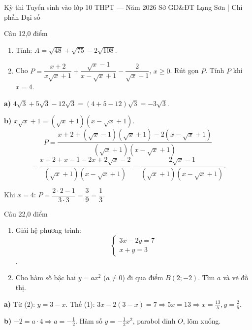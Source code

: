 ﻿%
%
  {Kỳ thi Tuyển sinh vào lớp 10 THPT — Năm 2026}%
  {Sở GD\&ĐT Lạng Sơn | Chỉ phần Đại số}

\begin{de_cau}{Câu 1}{2,0 điểm}
\begin{enumerate}[label=\alph*)]
\item Tính: $A = \sqrt{48} + \sqrt{75} - 2\sqrt{108}$.
\item Cho $P = \dfrac{x+2}{x\sqrt{x}+1} + \dfrac{\sqrt{x}-1}{x-\sqrt{x}+1} - \dfrac{2}{\sqrt{x}+1}$, $x\geq 0$.
Rút gọn $P$. Tính $P$ khi $x = 4$.
\end{enumerate}
\end{de_cau}

\begin{loi_giai_cau}
\textbf{a)} $4\sqrt{3}+5\sqrt{3}-12\sqrt{3}=(4+5-12)\sqrt{3}=-3\sqrt{3}$.

\textbf{b)} $x\sqrt{x}+1=(\sqrt{x}+1)(x-\sqrt{x}+1)$.
\[P=\frac{x+2+(\sqrt{x}-1)(\sqrt{x}+1)-2(x-\sqrt{x}+1)}{(\sqrt{x}+1)(x-\sqrt{x}+1)}\]
\[=\frac{x+2+x-1-2x+2\sqrt{x}-2}{(\sqrt{x}+1)(x-\sqrt{x}+1)}=\frac{2\sqrt{x}-1}{(\sqrt{x}+1)(x-\sqrt{x}+1)}.\]

Khi $x=4$: $P=\dfrac{2\cdot 2-1}{3\cdot 3}=\dfrac{3}{9}=\dfrac{1}{3}$.
\end{loi_giai_cau}

\begin{de_cau}{Câu 2}{2,0 điểm}
\begin{enumerate}[label=\alph*)]
\item Giải hệ phương trình: 
\[ \begin{cases}3x-2y=7\\x+y=3\end{cases} \].
\item Cho hàm số bậc hai $y=ax^2$ ($a\neq 0$) đi qua điểm $B(2;-2)$. Tìm $a$ và vẽ đồ thị.
\end{enumerate}
\end{de_cau}

\begin{loi_giai_cau}
\textbf{a)} Từ (2): $y=3-x$. Thế (1): $3x-2(3-x)=7\Rightarrow 5x=13\Rightarrow x=\frac{13}{5}, y=\frac{2}{5}$.

\textbf{b)} $-2=a\cdot 4\Rightarrow a=-\frac{1}{2}$. Hàm số $y=-\frac{1}{2}x^2$, parabol đỉnh $O$, lõm xuống.
\end{loi_giai_cau}

